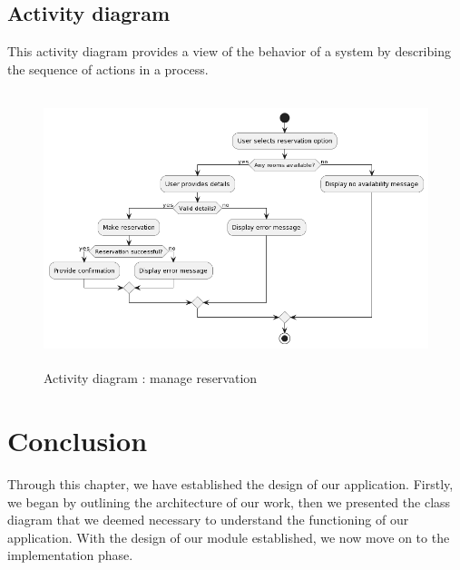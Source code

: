 \subsection{Activity diagram    }

This activity diagram provides a view of the behavior of a system by describing the sequence of actions in a process. 
\begin{figure}[H]
   \centering
    \includegraphics[width=15cm,height=8cm]{images/act.png}
    \caption{Activity diagram : manage reservation } 
    \label{activity diagram : manage reservation }
\end{figure}

\section{Conclusion }
Through this chapter, we have established the design of our application. Firstly, we began by outlining the architecture of our work, then we presented the class diagram that we deemed necessary to understand the functioning of our application. With the design of our module established, we now move on to the implementation phase. 